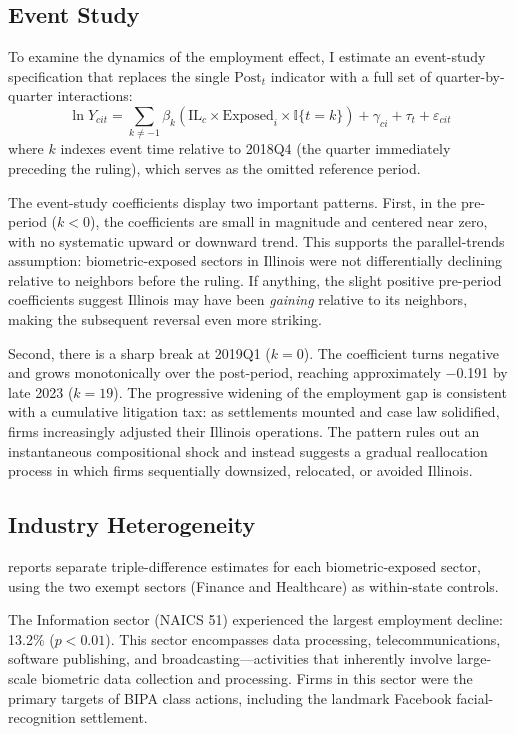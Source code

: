 \documentclass[12pt]{article}
\newcommand{\ind}{\mathbb{I}}
\begin{document}


\subsection{Event Study}

To examine the dynamics of the employment effect, I estimate an event-study specification that replaces the single $\text{Post}_t$ indicator with a full set of quarter-by-quarter interactions:
\begin{equation}
\ln Y_{cit} = \sum_{k \neq -1} \beta_k (\text{IL}_c \times \text{Exposed}_i \times \ind\{t = k\}) + \gamma_{ci} + \tau_t + \varepsilon_{cit}
\end{equation}
where $k$ indexes event time relative to 2018Q4 (the quarter immediately preceding the ruling), which serves as the omitted reference period.

The event-study coefficients display two important patterns. First, in the pre-period ($k < 0$), the coefficients are small in magnitude and centered near zero, with no systematic upward or downward trend. This supports the parallel-trends assumption: biometric-exposed sectors in Illinois were not differentially declining relative to neighbors before the ruling. If anything, the slight positive pre-period coefficients suggest Illinois may have been \emph{gaining} relative to its neighbors, making the subsequent reversal even more striking.

Second, there is a sharp break at 2019Q1 ($k = 0$). The coefficient turns negative and grows monotonically over the post-period, reaching approximately $-$0.191 by late 2023 ($k = 19$). The progressive widening of the employment gap is consistent with a cumulative litigation tax: as settlements mounted and case law solidified, firms increasingly adjusted their Illinois operations. The pattern rules out an instantaneous compositional shock and instead suggests a gradual reallocation process in which firms sequentially downsized, relocated, or avoided Illinois.

\subsection{Industry Heterogeneity}

 reports separate triple-difference estimates for each biometric-exposed sector, using the two exempt sectors (Finance and Healthcare) as within-state controls.

The Information sector (NAICS 51) experienced the largest employment decline: 13.2\% ($p < 0.01$). This sector encompasses data processing, telecommunications, software publishing, and broadcasting---activities that inherently involve large-scale biometric data collection and processing. Firms in this sector were the primary targets of BIPA class actions, including the landmark Facebook facial-recognition settlement.
\end{document}
